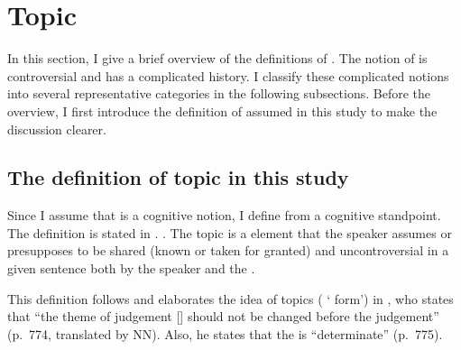 \section{Topic}\label{BackSecTopic}

In this section, I give a brief overview of the definitions of .
The notion of  is controversial and has a complicated history.
I classify these complicated notions into several representative categories in the following subsections.
Before the overview, I first introduce the definition of  assumed in this study to make the discussion clearer.

\subsection{The definition of topic in this study}\label{BackSubsecDefTopic}





Since I assume that  is a cognitive notion, I define  from a cognitive standpoint.
The definition is stated in \Next.
%
\ex. \label{BackDefTopic} The topic is a  element that the speaker assumes or presupposes to be shared (known or taken for granted) and uncontroversial in a given sentence both by the speaker and the .

This definition follows and elaborates the idea of topics ( ` form') in ,
who states that ``the theme of judgement [] should not be changed before the judgement'' (p.~774, translated by NN).
Also, he states that the  is ``determinate'' (p.~775).

